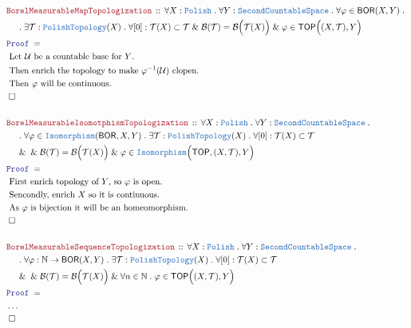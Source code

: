 \documentclass[12pt]{scrartcl}
\newcommand{\TYPE}[1]{\textcolor{NavyBlue}{\mathtt{#1}}}
\newcommand{\LOGIC}[1]{\textcolor{Blue}{\mathtt{#1}}}
\newcommand{\THM}[1]{\textcolor{Maroon}{\mathtt{#1}}}
\renewcommand{\.}{\; . \;}
\newcommand{\Theorem}[2]{& \THM{#1} \, :: \, #2 \\ & \Proof = \\ }
\newcommand{\NewLine}{\\ & \kern 1pc}
\newcommand{\Page}[1]{ \begin{align*} #1 \end{align*}   }
\newcommand{\NoProof}{ & \ldots \\ \EndProof}
\renewcommand{\And}{\; \& \;}
\newcommand{\Nat}{\mathbb{N} }
\newcommand{\QED}{\; \square}
\newcommand{\EndProof}{& \QED \\}
\newcommand{\Proof}{\LOGIC{Proof} \; }
\newcommand{\Explain}[1]{& \text{#1.} \\}
\newcommand{\B}{\mathcal{B}}
\newcommand{\TOP}{\mathsf{TOP}}
\newcommand{\T}{\mathcal{T}}
\newcommand{\U}{\mathcal{U}}
\newcommand{\Polish}{\TYPE{Polish}}
\newcommand{\BOR}{\mathsf{BOR}}
\begin{document}
\Page{
	\Theorem{BorelMeasurableMapTopologization}
	{
		\forall X : \Polish \.
		\forall Y  : \TYPE{SecondCountableSpace} \.
		\forall \varphi \in \BOR(X,Y) \. \NewLine \.
		\exists \T : \TYPE{PolishTopology}(X) \.
		\forall [0] : \T(X) \subset \T
		\And
		\B(\T) = \B\Big( \T(X) \Big)
		\And	
		\varphi \in \TOP\Big( (X,\T), Y\Big)
	}
	\Explain{ Let $\U$ be a countable base for $Y$}
	\Explain{ Then enrich the topology to make $\varphi^{-1}(\U)$ clopen}
	\Explain{ Then $\varphi$ will be continuous}
	\EndProof
	\\
	\Theorem{BorelMeasurableIsomotphismTopologization}
	{
		\forall X : \Polish \.
		\forall Y  : \TYPE{SecondCountableSpace} \. \NewLine \.
		\forall \varphi \in \TYPE{Isomorphism}(\BOR,X,Y) \. 
		\exists \T : \TYPE{PolishTopology}(X) \.
		\forall [0] : \T(X) \subset \T  \NewLine \And
		\And
		\B(\T) = \B\Big( \T(X) \Big)
		\And	
		\varphi \in \TYPE{Isomorphism}\Big(\TOP, (X,\T), Y\Big)
	}
	\Explain{ First enrich topology of $Y$, so $\varphi$ is open}
	\Explain{ Sencondly, enrich $X$ so it is continuous}
	\Explain{ As $\varphi$ is bijection it will be an homeomorphism} 	
	\EndProof
	\\
	\Theorem{BorelMeasurableSequenceTopologization}
	{
		\forall X : \Polish \.
		\forall Y  : \TYPE{SecondCountableSpace} \. \NewLine \.
		\forall \varphi : \Nat \to \BOR(X,Y) \. 
		\exists \T : \TYPE{PolishTopology}(X) \.
		\forall [0] : \T(X) \subset \T  \NewLine \And
		\And
		\B(\T) = \B\Big( \T(X) \Big)
		\And	
		\forall n \in \Nat \.
		\varphi \in \TOP\Big( (X,\T), Y\Big)
	}
	\NoProof
}
\newpage
\end{document}
